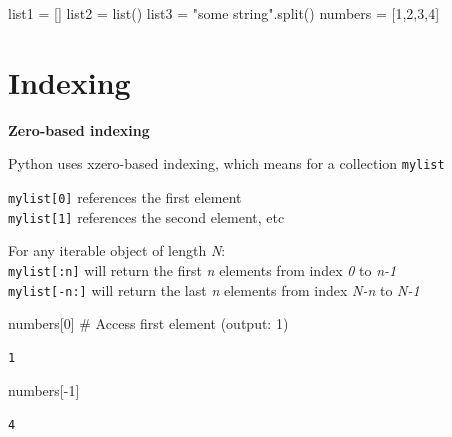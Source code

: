 \documentclass[
  letterpaper,
  DIV=11,
  numbers=noendperiod]{scrreprt}
\newenvironment{Shaded}{\begin{snugshade}}{\end{snugshade}}
\newcommand{\BuiltInTok}[1]{\textcolor[rgb]{0.00,0.23,0.31}{#1}}
\newcommand{\CommentTok}[1]{\textcolor[rgb]{0.37,0.37,0.37}{#1}}
\newcommand{\DecValTok}[1]{\textcolor[rgb]{0.68,0.00,0.00}{#1}}
\newcommand{\NormalTok}[1]{\textcolor[rgb]{0.00,0.23,0.31}{#1}}
\newcommand{\OperatorTok}[1]{\textcolor[rgb]{0.37,0.37,0.37}{#1}}
\newcommand{\StringTok}[1]{\textcolor[rgb]{0.13,0.47,0.30}{#1}}
\begin{document}
\begin{Shaded}
\begin{Highlighting}[]
\NormalTok{list1 }\OperatorTok{=}\NormalTok{ []}
\NormalTok{list2 }\OperatorTok{=} \BuiltInTok{list}\NormalTok{()}
\NormalTok{list3 }\OperatorTok{=} \StringTok{"some string"}\NormalTok{.split()}
\NormalTok{numbers }\OperatorTok{=}\NormalTok{ [}\DecValTok{1}\NormalTok{,}\DecValTok{2}\NormalTok{,}\DecValTok{3}\NormalTok{,}\DecValTok{4}\NormalTok{] }
\end{Highlighting}
\end{Shaded}

\hypertarget{indexing-1}{%
\section{Indexing}\label{indexing-1}}

\textbf{Zero-based indexing}

Python uses xzero-based indexing, which means for a collection
\texttt{mylist}

\texttt{mylist{[}0{]}} references the first element\\
\texttt{mylist{[}1{]}} references the second element, etc

For any iterable object of length \emph{N}:\\
\texttt{mylist{[}:n{]}} will return the first \emph{n} elements from
index \emph{0} to \emph{n-1}\\
\texttt{mylist{[}-n:{]}} will return the last \emph{n} elements from
index \emph{N-n} to \emph{N-1}

\begin{Shaded}
\begin{Highlighting}[]
\NormalTok{numbers[}\DecValTok{0}\NormalTok{] }\CommentTok{\# Access first element (output: 1)}
\end{Highlighting}
\end{Shaded}

\begin{verbatim}
1
\end{verbatim}

\begin{Shaded}
\begin{Highlighting}[]
\NormalTok{numbers[}\OperatorTok{{-}}\DecValTok{1}\NormalTok{]}
\end{Highlighting}
\end{Shaded}

\begin{verbatim}
4
\end{verbatim}
\end{document}
